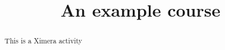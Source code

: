 \documentclass{xourse}
\title{An example course}
\begin{document}
\begin{abstract}
This is a Ximera activity
\end{abstract}

\maketitle

\end{document}
